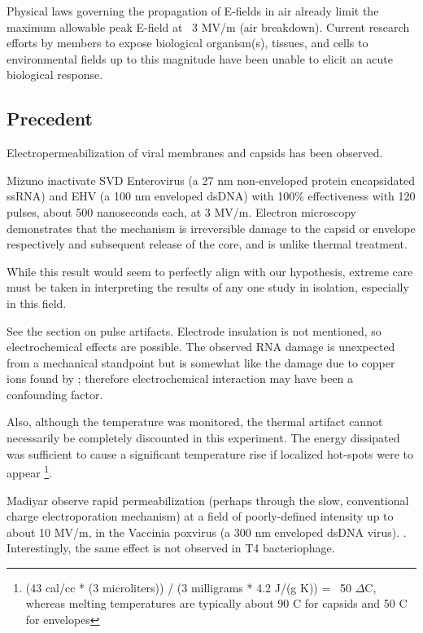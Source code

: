 \documentclass[paper.tex]{subfiles}
\begin{document}
\begin{multicols}{1}
\begin{fquote}
	Physical laws governing the propagation of E-fields in air already limit the maximum allowable peak E-field at ~3 MV/m (air breakdown). Current research efforts by members to expose biological organism(s), tissues, and cells to environmental
	fields up to this magnitude have been unable to elicit an acute biological response.
\end{fquote}

\subsection{Precedent}

Electropermeabilization of viral membranes and capsids has been observed.

Mizuno \cite{Inactivation1990} inactivate SVD Enterovirus (a 27 nm non-enveloped protein encapsidated ssRNA) and EHV (a 100 nm enveloped dsDNA) with 100\% effectiveness with 120 pulses, about 500 nanoseconds each, at 3 MV/m. Electron microscopy demonstrates that the mechanism is irreversible damage to the capsid or envelope respectively and subsequent release of the core, and is unlike thermal treatment.

While this result would seem to perfectly align with our hypothesis, extreme care must be taken in interpreting the results of any one study in isolation, especially in this field. 

See the section on pulse artifacts. Electrode insulation is not mentioned, so electrochemical effects are possible. The observed RNA damage is unexpected from a mechanical standpoint but is somewhat like the damage due to copper ions found by \cite{Microwave1987}; therefore electrochemical interaction may have been a confounding factor.

Also, although the temperature was monitored, the thermal artifact cannot necessarily be completely discounted in this experiment. The energy dissipated was sufficient to cause a significant temperature rise if localized hot-spots were to appear \footnote{(43 cal/cc * (3 microliters)) / (3 milligrams * 4.2 J/(g K)) = ~50 $\Delta$C, whereas melting temperatures are typically about 90 C for capsids \cite{Thermal1999} and 50 C for envelopes\cite{Stability1985}}.


Madiyar \cite{Manipulation2013} observe rapid permeabilization (perhaps through the slow, conventional charge electroporation mechanism) at a field of poorly-defined intensity up to about 10 MV/m, in the Vaccinia poxvirus (a 300 nm enveloped dsDNA virus). \cite{AC2017}. Interestingly, the same effect is not observed in T4 bacteriophage. 


\end{multicols}
\end{document}
